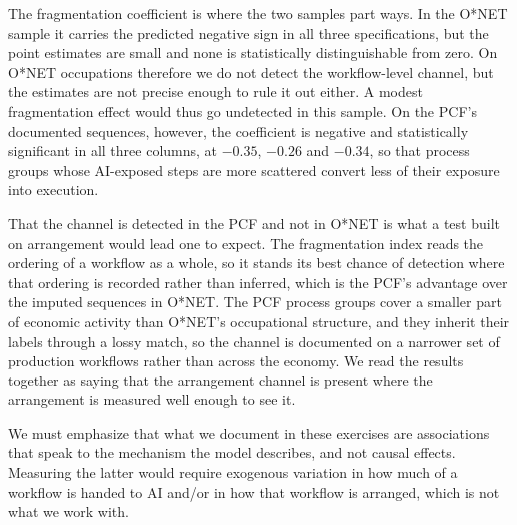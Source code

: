 The fragmentation coefficient is where the two samples part ways.
In the O*NET sample it carries the predicted negative sign in all three specifications, but the point estimates are small and none is statistically distinguishable from zero.
On O*NET occupations therefore we do not detect the workflow-level channel, but the estimates are not precise enough to rule it out either.
A modest fragmentation effect would thus go undetected in this sample.
On the PCF's documented sequences, however, the coefficient is negative and statistically significant in all three columns, at $-0.35$, $-0.26$ and $-0.34$, so that process groups whose AI-exposed steps are more scattered convert less of their exposure into execution.

That the channel is detected in the PCF and not in O*NET is what a test built on arrangement would lead one to expect.
The fragmentation index reads the ordering of a workflow as a whole, so it stands its best chance of detection where that ordering is recorded rather than inferred, which is the PCF's advantage over the imputed sequences in O*NET.
The PCF process groups cover a smaller part of economic activity than O*NET's occupational structure, and they inherit their labels through a lossy match, so the channel is documented on a narrower set of production workflows rather than across the economy.
We read the results together as saying that the arrangement channel is present where the arrangement is measured well enough to see it.

We must emphasize that what we document in these exercises are associations that speak to the mechanism the model describes, and not causal effects.
Measuring the latter would require exogenous variation in how much of a workflow is handed to AI and/or in how that workflow is arranged, which is not what we work with.